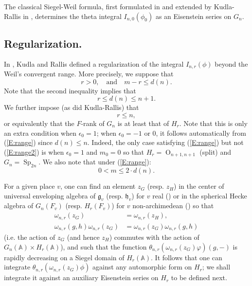 \documentclass[10pt]{amsart}
\theoremstyle{plain}
\numberwithin{equation}{section}
\begin{document}
The classical Siegel-Weil formula, first formulated in  \cite{We} and  extended by
Kudla-Rallis in \cite{KR1}, determines the theta integral
$I_{n,0}(\phi_0)$ as an Eisenstein series on $G_n$. 
 \vskip 10pt
 
 
 \subsection{\bf Regularization.} \label{SS:kr-reg}
 In \cite{KR5}, Kudla and Rallis defined a regularization of the
 integral $I_{n,r}(\phi)$ beyond the Weil's convergent range. More
 precisely, we suppose that 
 \begin{equation} \label{E:range}
 r>0 , \quad  \text{and} \quad  m - r \leq d(n).  
\end{equation}
Note that the second inequality implies that
\[   r \leq d(n)  \leq n+1. \]
We further impose (as did Kudla-Rallis) that
\begin{equation}\label{E:range2}
 r \leq n, 
\end{equation}
or equivalently that the $F$-rank of $G_n$ is at least that of $H_r$. 
Note that this is only an extra condition when $\epsilon_0 =1$; when
$\epsilon_0 =-1$ or $0$, it follows automatically from (\ref{E:range})
since $d(n) \leq n$. Indeed, the only case satisfying (\ref{E:range})
but not (\ref{E:range2}) is when $\epsilon_0 =1$ and $m_0 = 0$ so that
$H_r = {\operatorname{O}}_{n+1,n+1}$ (split) and $G_n = {\operatorname{Sp}}_{2n}$.  We also note that
under (\ref{E:range}):
\[  0 < m \leq 2 \cdot d(n). \]
\vskip 5pt

 For a given place $v$,  one can find an element $z_G$ (resp. $z_H$)
 in the center of universal enveloping algebra of $\mathfrak{g}_v$
 (resp. $\mathfrak{h}_v$) for $v$ real (\cite{KR5}) or in the spherical Hecke
 algebra of $G_n(F_v)$ (resp. $H_r(F_v)$) for $v$ non-archimedean
 (\cite{I1, I2, T1})  so that
  \begin{align*}
    \omega_{n,r}(z_G)&=\omega_{n,r}(z_H),\\
    \omega_{n,r}(g,h)\omega_{n,r}(z_G)&=\omega_{n,r}(z_G)\omega_{n,r}(g,h)
\end{align*}
(i.e. the action of $z_G$ (and hence $z_H$) commutes with the action
of $G_n({\mathbb{A}})\times H_r({\mathbb{A}})$),
and such that the function $\theta_{n,r}(\omega_{n,r}(z_G)\varphi)(g,-)$ is
rapidly decreasing on a Siegel domain of $H_r({\mathbb{A}})$. It follows that
one can integrate $\theta_{n,r}(\omega_{n,r}(z_G) \phi)$ against any
automorphic form on $H_r$; we shall integrate it against an auxiliary
Eisenstein series on $H_r$ to be defined next. 
\vskip 15pt
\end{document}
